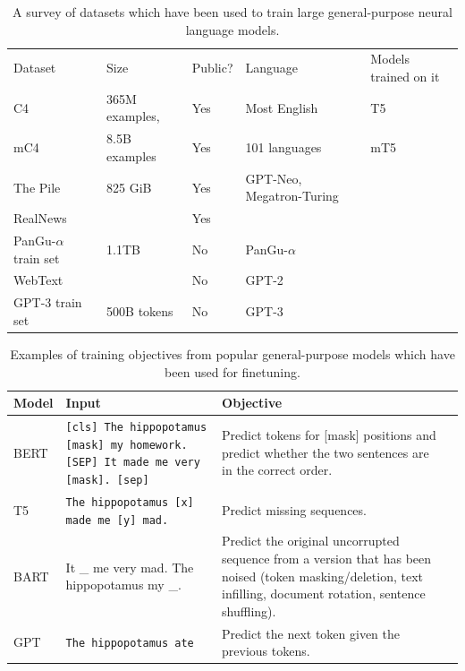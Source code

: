 \begin{itemize}
\begin{table}[htbp]
  \centering
  \small
    \begin{tabular}{lllll}
    \toprule
    Dataset & \multicolumn{1}{l}{Size} & \multicolumn{1}{l}{Public?} & Language & \multicolumn{1}{l}{Models trained on it} \\
    C4 \citep{raffel2019exploring}   &  365M examples,      & {Yes} & Most English & {T5} \\
    mC4 \citep{xue2020mt5}   &  8.5B examples  & {Yes} & 101 languages & {mT5} \\
    The Pile \citep{gao2020pile} & 825 GiB & {Yes} & {GPT-Neo, Megatron-Turing} \\
    RealNews &       & {Yes} &       \\
    PanGu-$\alpha$ train set & {1.1TB} & {No} & {PanGu-$\alpha$} \\
    WebText &       & {No} & {GPT-2} \\
    GPT-3 train set & {500B tokens} & {No} & {GPT-3} 
    \end{tabular}%
  \caption{A survey of datasets which have been used to train large general-purpose neural language models. }
  \label{tab:dataset_list}%
\end{table}%


\begin{table}
    \centering
    \begin{tabular}{l|l|p{2in}|p{2in}}
        Model & Input & Objective \\
        \hline
        BERT \citep{devlin2018bert} & \texttt{[cls] The hippopotamus [mask] my homework. [SEP] It made me very [mask]. [sep]} &  Predict tokens for [mask] positions and predict whether the two sentences are in the correct order.\\
        T5 \citep{raffel2019exploring} & \texttt{The hippopotamus [x] made me [y] mad.} & Predict missing sequences.  \\
        BART & It \_ me very mad. The hippopotamus my \_. &  Predict the original uncorrupted sequence from a version that has been noised (token masking/deletion, text infilling, document rotation, sentence shuffling). \\
        GPT \citep{radford2019language,brown2020language} & \texttt{The hippopotamus ate} & Predict the next token given the previous tokens.\\
    \end{tabular}
    \caption{Examples of training objectives from popular general-purpose models which have been used for finetuning.}
    \label{tab:common_pretrained_models}
\end{table}


\end{itemize}
